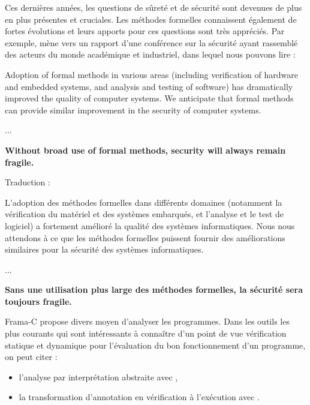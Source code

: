 Ces dernières années, les questions de sûreté et de sécurité sont devenues de
plus en plus présentes et cruciales. Les méthodes formelles connaissent également
de fortes évolutions et leurs apports pour ces questions sont très appréciés.
Par exemple,  mène vers
un rapport d'une conférence sur la sécurité ayant rassemblé des acteurs du monde
académique et industriel, dans lequel nous pouvons lire :



\begin{Quotation}
Adoption of formal methods in various areas (including verification of hardware
and embedded systems, and analysis and testing of software) has dramatically
improved the quality of computer systems.  We anticipate that formal methods
can provide similar improvement in the security of computer systems.

...

\textbf{Without broad use of formal methods, security will always remain fragile.}
\end{Quotation}



\begin{Spoiler}
Traduction :

L'adoption des méthodes formelles dans différents domaines (notamment la
vérification du matériel et des systèmes embarqués, et l'analyse et le test
de logiciel) a fortement amélioré la qualité des systèmes informatiques.
Nous nous attendons à ce que les méthodes formelles puissent fournir des
améliorations similaires pour la sécurité des systèmes informatiques.

...

\textbf{Sans une utilisation plus large des méthodes formelles, la sécurité sera
toujours fragile.}
\end{Spoiler}






Frama-C propose divers moyen d'analyser les programmes. Dans les outils les
plus courants qui sont intéressants à connaître d'un point de vue vérification
statique et dynamique pour l'évaluation du bon fonctionnement d'un programme,
on peut citer :



\begin{itemize}
\item l'analyse par interprétation abstraite avec
,
\item la transformation d'annotation en vérification à l'exécution avec
.
\end{itemize}


